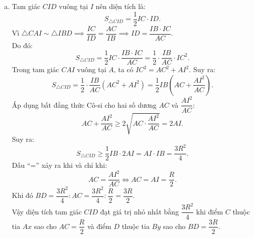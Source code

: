 \begin{bt}
{\begin{enumerate}[a)]
	Vì $R$ không đổi nên tích $AC \cdot BD$ không đổi.
	\item Tam giác $CID$ vuông tại $I$ nên diện tích là:
	$$S_{\triangle CID} = \dfrac{1}{2} IC \cdot ID.$$
	Vì $\triangle CAI \sim \triangle IBD \implies \dfrac{IC}{ID} = \dfrac{AC}{IB} \implies ID = \dfrac{IB \cdot IC}{AC}$.\\
	Do đó:
	$$S_{\triangle CID} = \dfrac{1}{2} IC \cdot \dfrac{IB \cdot IC}{AC} = \dfrac{1}{2} \cdot \dfrac{IB}{AC} \cdot IC^2.$$
	Trong tam giác $CAI$ vuông tại $A$, ta có $IC^2 = AC^2 + AI^2$. Suy ra:
	$$S_{\triangle CID} = \dfrac{1}{2} \cdot \dfrac{IB}{AC} (AC^2 + AI^2) = \dfrac{1}{2} IB \left(AC + \dfrac{AI^2}{AC}\right).$$
	Áp dụng bất đẳng thức Cô-si cho hai số dương $AC$ và $\dfrac{AI^2}{AC}$:
	$$AC + \dfrac{AI^2}{AC} \ge 2\sqrt{AC \cdot \dfrac{AI^2}{AC}} = 2AI.$$
	Suy ra:
	$$S_{\triangle CID} \ge \dfrac{1}{2} IB \cdot 2AI = AI \cdot IB = \dfrac{3R^2}{4}.$$
	Dấu ``='' xảy ra khi và chỉ khi:
	$$AC = \dfrac{AI^2}{AC} \iff AC = AI = \dfrac{R}{2}.$$
	Khi đó $BD = \dfrac{3R^2}{4} : AC = \dfrac{3R^2}{4} : \dfrac{R}{2} = \dfrac{3R}{2}$.\\
	Vậy diện tích tam giác $CID$ đạt giá trị nhỏ nhất bằng $\dfrac{3R^2}{4}$ khi điểm $C$ thuộc tia $Ax$ sao cho $AC = \dfrac{R}{2}$ và điểm $D$ thuộc tia $By$ sao cho $BD = \dfrac{3R}{2}$.
\end{enumerate}
}
\end{bt}


